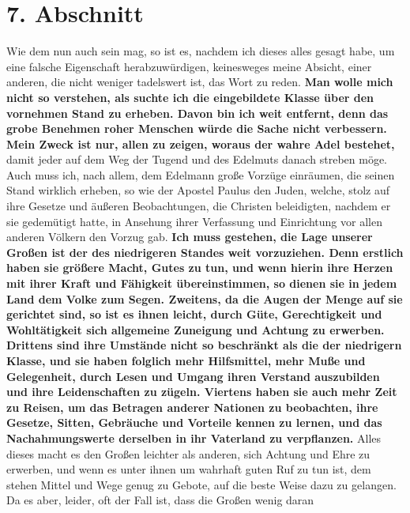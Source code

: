 \section{7. Abschnitt} \label{kap11_ab7}

Wie dem nun auch sein mag, so ist es, nachdem ich dieses alles gesagt habe, um
eine falsche Eigenschaft herabzuwürdigen, keinesweges meine Absicht, einer
anderen, die nicht weniger tadelswert ist, das Wort zu reden. \textbf{Man wolle
mich
nicht so verstehen, als suchte ich die eingebildete
Klasse über den vornehmen
Stand zu erheben. Davon bin ich weit entfernt, denn das grobe
Benehmen roher
Menschen würde die Sache nicht verbessern. Mein Zweck ist nur, allen zu zeigen,
woraus der wahre Adel bestehet,} damit jeder auf dem Weg der Tugend und des
Edelmuts danach streben möge. Auch muss ich, nach allem, dem Edelmann große
Vorzüge einräumen, die seinen Stand wirklich erheben, so wie der Apostel
Paulus
den Juden, welche, stolz auf ihre Gesetze und äußeren
Beobachtungen, die Christen
beleidigten, nachdem er sie gedemütigt hatte, in Ansehung ihrer Verfassung und
Einrichtung vor allen anderen Völkern den Vorzug gab.
\label{ref:11_07_standesvorteil} \textbf{Ich muss gestehen, die Lage
unserer  Großen ist der des
niedrigeren
Standes weit vorzuziehen. Denn erstlich
haben sie größere Macht, Gutes zu tun, und wenn hierin ihre Herzen mit ihrer
Kraft und Fähigkeit übereinstimmen, so dienen sie in jedem Land dem Volke zum
Segen. Zweitens, da die Augen der Menge auf sie gerichtet sind, so ist es ihnen
leicht, durch Güte, Gerechtigkeit und Wohltätigkeit sich
allgemeine Zuneigung
und Achtung zu erwerben. Drittens sind ihre Umstände nicht so beschränkt als die
der niedrigern Klasse, und sie haben folglich mehr Hilfsmittel, mehr
Muße und
Gelegenheit, durch Lesen und Umgang ihren Verstand
auszubilden und ihre
Leidenschaften zu zügeln. Viertens haben sie auch mehr Zeit zu
Reisen, um das
Betragen anderer Nationen zu beobachten, ihre Gesetze, Sitten, Gebräuche und
Vorteile kennen zu lernen, und das Nachahmungswerte derselben in ihr Vaterland
zu verpflanzen.} Alles dieses macht es den Großen leichter als anderen, sich
Achtung und Ehre zu erwerben, und wenn es unter ihnen um wahrhaft guten Ruf zu
tun ist, dem stehen Mittel und Wege genug zu Gebote, auf die beste Weise dazu
zu gelangen. Da es aber, leider, oft der Fall ist, dass die Großen wenig daran
